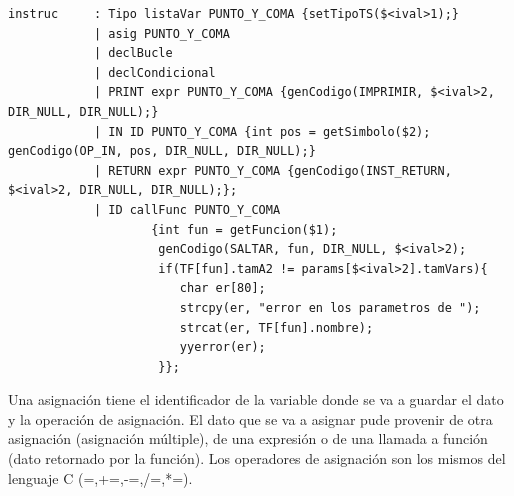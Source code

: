 \documentclass[a4paper,12pt]{article}
\begin{document}
\begin{enumerate}
\begin{enumerate}
\begin{itemize}
   \begin{lstlisting}
instruc 	: Tipo listaVar PUNTO_Y_COMA {setTipoTS($<ival>1);}
			| asig PUNTO_Y_COMA
			| declBucle
			| declCondicional
			| PRINT expr PUNTO_Y_COMA {genCodigo(IMPRIMIR, $<ival>2, DIR_NULL, DIR_NULL);}
			| IN ID PUNTO_Y_COMA {int pos = getSimbolo($2); genCodigo(OP_IN, pos, DIR_NULL, DIR_NULL);}
			| RETURN expr PUNTO_Y_COMA {genCodigo(INST_RETURN, $<ival>2, DIR_NULL, DIR_NULL);};
			| ID callFunc PUNTO_Y_COMA 
					{int fun = getFuncion($1);
					 genCodigo(SALTAR, fun, DIR_NULL, $<ival>2);
					 if(TF[fun].tamA2 != params[$<ival>2].tamVars){
					 	char er[80];
						strcpy(er, "error en los parametros de ");
						strcat(er, TF[fun].nombre);
						yyerror(er);
					 }};    
   \end{lstlisting}
   Una asignación tiene el identificador de la variable donde se va a guardar el dato y la operación de asignación.
   El dato que se va a asignar pude provenir de otra asignación (asignación múltiple), de una expresión o de una llamada a función (dato retornado por la función).
   Los operadores de asignación son los mismos del lenguaje C (=,+=,-=,/=,*=).
   

\end{itemize}
\end{enumerate}
\end{enumerate}
\end{document}

